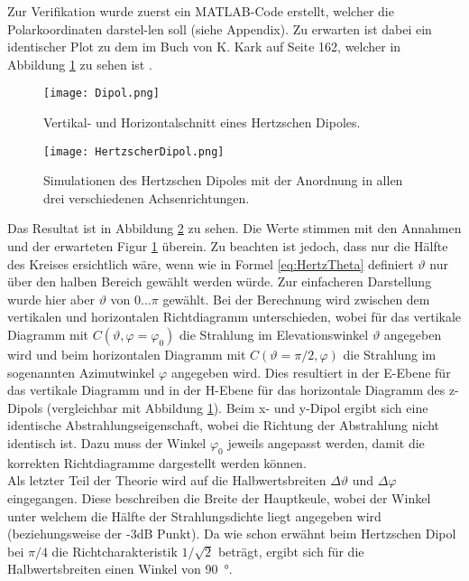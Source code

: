 Zur Verifikation wurde zuerst ein MATLAB-Code erstellt, welcher die Polarkoordinaten darstel-len soll (siehe Appendix). Zu erwarten ist dabei ein identischer Plot zu dem im Buch von K. Kark auf Seite 162, welcher in Abbildung \ref{fig:dipol} zu sehen ist \cite{book}.

\begin{figure}[!ht]
	\centering
	\texttt{[image: Dipol.png]}
	\caption{Vertikal- und Horizontalschnitt eines Hertzschen Dipoles.}\label{fig:dipol}
\end{figure}

\newpage

\begin{figure}[!ht]
	\centering
    \texttt{[image: HertzscherDipol.png]}
    \caption{Simulationen des Hertzschen Dipoles mit der Anordnung in allen drei verschiedenen Achsenrichtungen.}
    \label{fig:HertzscherDipol}
\end{figure}

Das Resultat ist in Abbildung \ref{fig:HertzscherDipol} zu sehen. Die Werte stimmen mit den Annahmen und der erwarteten Figur \ref{fig:dipol} überein. Zu beachten ist jedoch, dass nur die Hälfte des Kreises ersichtlich wäre, wenn wie in Formel \ref{eq:HertzTheta} definiert $\vartheta$ nur über den halben Bereich gewählt werden würde. Zur einfacheren Darstellung wurde hier aber $\vartheta$ von $0 ... \pi$ gewählt. Bei der Berechnung wird zwischen dem vertikalen und horizontalen Richtdiagramm unterschieden, wobei für das vertikale Diagramm mit $C(\vartheta, \varphi = \varphi_0)$ die Strahlung im Elevationswinkel $\vartheta$ angegeben wird und beim horizontalen Diagramm mit $C(\vartheta=\pi/2, \varphi)$ die Strahlung im sogenannten Azimutwinkel $\varphi$ angegeben wird. Dies resultiert in der E-Ebene für das vertikale Diagramm und in der H-Ebene für das horizontale Diagramm des z-Dipols (vergleichbar mit Abbildung \ref{fig:dipol}). Beim x- und y-Dipol ergibt sich eine identische Abstrahlungseigenschaft, wobei die Richtung der Abstrahlung nicht identisch ist. Dazu muss der Winkel $\varphi_0$ jeweils angepasst werden, damit die korrekten Richtdiagramme dargestellt werden können.\\

Als letzter Teil der Theorie wird auf die Halbwertsbreiten $\Delta \vartheta$ und $\Delta \varphi$ eingegangen. Diese beschreiben die Breite der Hauptkeule, wobei der Winkel unter welchem die Hälfte der Strahlungsdichte liegt angegeben wird (beziehungsweise der -3dB Punkt). Da wie schon erwähnt beim Hertzschen Dipol bei $\pi/4$ die Richtcharakteristik $1/\sqrt{2}$ beträgt, ergibt sich für die Halbwertsbreiten einen Winkel von \SI{90}{\degree}.

